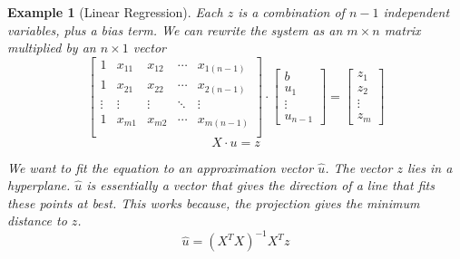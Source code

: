 \documentclass{book}
\newtheorem{example}{Example}[section]
\begin{document}
\begin{example}[Linear Regression]
    Each $z$ is a combination of $n-1$ independent variables, plus a bias term. We
    can rewrite the system as an $m\times n$ matrix multiplied by an $n\times 1$
    vector
    \begin{equation}
        \left[
            \begin{matrix}
                1      & x_{11} & x_{12} & \cdots & x_{1(n-1)} \\
                1      & x_{21} & x_{22} & \cdots & x_{2(n-1)} \\
                \vdots & \vdots & \vdots & \ddots & \vdots     \\
                1      & x_{m1} & x_{m2} & \cdots & x_{m(n-1)} \\
            \end{matrix}
            \right]\cdot \left[
            \begin{matrix}
                b \\ u_1 \\\vdots\\u_{n-1}
            \end{matrix}
            \right] = \left[
            \begin{matrix}
                z_1 \\z_2\\\vdots\\z_m
            \end{matrix}
            \right]
    \end{equation}
    \begin{equation*}
        X\cdot u = z
    \end{equation*}

    We want to fit the equation to an approximation vector $\hat u$. The vector $z$
    lies in a hyperplane. $\hat u$ is essentially a vector that gives the direction
    of a line that fits these points at best. This works because, the projection
    gives the minimum distance to $z$.
    \begin{equation}
        \hat u = {\left(X^{T}X\right)}^{-1}X^{T}z
    \end{equation}


\end{example}
\end{document}
